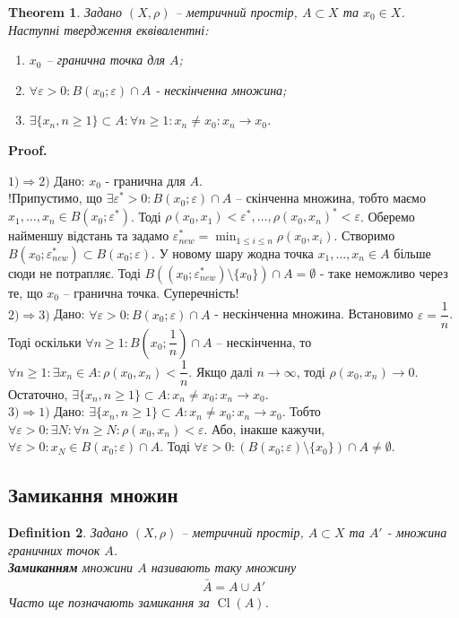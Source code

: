 \documentclass[a4paper, 10pt]{article}
\makeatletter
\theoremstyle{theoremdd}
\newtheorem{theorem}{Theorem}[subsection]
\theoremstyle{theoremdd}
\newtheorem{definition}[theorem]{Definition}
\theoremstyle{theoremdd}
\theoremstyle{theoremdd}
\theoremstyle{theoremdd}
\theoremstyle{theoremdd}
\theoremstyle{theoremdd}
\theoremstyle{theoremdd}
\renewenvironment{proof}[1][Proof.\\]{\par
\pushQED{\hfill \qed}%
\normalfont \topsep6\p@\@plus6\p@\relax
\trivlist
\item\relax
{\bfseries
#1\@addpunct{.}}\hspace\labelsep\ignorespaces
}{%
\popQED\endtrivlist\@endpefalse
}
\DeclareMathOperator{\Cl}{Cl}
\makeatother
\begin{document}
\begin{theorem}
Задано $(X,\rho)$ -- метричний простір, $A \subset X$ та $x_0 \in X$. Наступні твердження еквівалентні:
\begin{enumerate}[nosep,wide=0pt,label={\arabic*)}]
\item $x_0$ -- гранична точка для $A$;
\item $\forall \varepsilon > 0: B(x_0;\varepsilon) \cap A$ - нескінченна множина;
\item $\exists \{x_n, n \geq 1\} \subset A: \forall n \geq 1: x_n \neq x_0: x_n \to x_0$.
\end{enumerate}
\end{theorem}

\begin{proof}
$\boxed{1) \Rightarrow 2)}$ Дано: $x_0$ - гранична для $A$.\\
!Припустимо, що $\exists \varepsilon^* > 0: B(x_0;\varepsilon) \cap A$ -- скінченна множина, тобто маємо  $x_1,\dots,x_n \in B(x_0;\varepsilon^*)$. Тоді $\rho(x_0,x_1) < \varepsilon^*, \dots, \rho(x_0,x_n)^* < \varepsilon$. Оберемо найменшу відстань та задамо $\varepsilon^*_{new} = \displaystyle \min_{1\leq i \leq n} \rho(x_0,x_i)$. Створимо $B(x_0;\varepsilon^*_{new}) \subset B(x_0; \varepsilon)$. У новому шару жодна точка $x_1,\dots,x_n \in A$ більше сюди не потрапляє. Тоді $B((x_0;\varepsilon^*_{new}) \setminus \{x_0\}) \cap A = \emptyset$ - таке неможливо через те, що $x_0$ -- гранична точка. Суперечність!
\bigskip \\
$\boxed{2) \Rightarrow 3)}$ Дано: $\forall \varepsilon > 0: B(x_0;\varepsilon) \cap A$ - нескінченна множина. Встановимо $\varepsilon = \dfrac{1}{n}$. Тоді оскільки $\forall n \geq 1: B \left(x_0;\dfrac{1}{n} \right) \cap A$ -- нескінченна, то $\forall n \geq 1: \exists x_n \in A: \rho(x_0,x_n) < \dfrac{1}{n}$. Якщо далі $n \to \infty$, тоді $\rho(x_0,x_n) \to 0$. Остаточно, $\exists \{x_n, n \geq 1\} \subset A: x_n \neq x_0: x_n \to x_0$.
\bigskip \\
$\boxed{3) \Rightarrow 1)}$ Дано: $\exists \{x_n, n \geq 1\} \subset A: x_n \neq x_0: x_n \to x_0$. Тобто $\forall \varepsilon > 0: \exists N: \forall n \geq N: \rho(x_0,x_n) < \varepsilon$. Або, інакше кажучи, $\forall \varepsilon > 0: x_N \in B(x_0;\varepsilon) \cap A$. Тоді $\forall \varepsilon > 0: (B(x_0;\varepsilon) \setminus \{x_0\}) \cap A \neq \emptyset$.
\end{proof}

\subsection{Замикання множин}
\begin{definition}
Задано $(X,\rho)$ -- метричний простір, $A \subset X$ та $A'$ - множина граничних точок $A$.\\
\textbf{Замиканням} множини $A$ називають таку множину
\begin{align*}
\bar{A} = A \cup A'
\end{align*}
Часто ще позначають замикання за $\Cl(A)$.
\end{definition}
\end{document}
